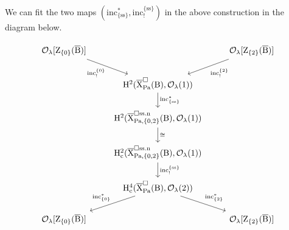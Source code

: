 \documentclass[10pt]{amsart}
\numberwithin{equation}{section}
\theoremstyle{definition}
\def\Pa{\mathrm{Pa}}
\def\calO{\mathcal{O}}
\def\rmc{\mathrm{c}}
\def\rmB{\mathrm{B}}
\def\rmH{\mathrm{H}}
\def\rmX{\mathrm{X}}
\def\rmZ{\mathrm{Z}}
\begin{document}
We can fit the two maps $(\mathrm{inc}^{\ast}_{\{\mathrm{ss}\}}, \mathrm{inc}^{\{\mathrm{ss}\}}_{!})$ in the above construction in the diagram below.

\begin{equation}\label{ss-diagram}
\begin{tikzcd}
 \calO_{\lambda}[\rmZ_{\{0\}}(\overline{\rmB})] \arrow[rd, "\mathrm{inc}^{\{0\}}_{!}"'] &                                    &  \calO_{\lambda}[\rmZ_{\{2\}}(\overline{\rmB})]\arrow[ld, "\mathrm{inc}^{\{2\}}_{!}"] \\
                   & \rmH^{2}(\overline{\rmX}^{\square}_{\Pa}(\rmB), \calO_{\lambda}(1)) \arrow[d, "\mathrm{inc}^{\ast}_{\{\mathrm{ss}\}}"]                   &                   \\
                   & \rmH^{2}(\overline{\rmX}^{\square\mathrm{ss.n}}_{\Pa,\{0,2\}}(\rmB), \calO_{\lambda}(1)) \arrow[d, "\cong"]                   &                   \\
                    & \rmH^{2}_{\rmc}(\overline{\rmX}^{\square\mathrm{ss.n}}_{\Pa,\{0,2\}}(\rmB), \calO_{\lambda}(1)) \arrow[d, "\mathrm{inc}^{\{\mathrm{ss}\}}_{!}"]                   &                   \\
                   &  \rmH^{4}_{\rmc}(\overline{\rmX}^{\square}_{\Pa}(\rmB), \calO_{\lambda}(2)) \arrow[ld, "\mathrm{inc}^{\ast}_{\{0\}}"'] \arrow[rd, "\mathrm{inc}^{\ast}_{\{2\}}"] &                   \\
 \calO_{\lambda}[\rmZ_{\{0\}}(\overline{\rmB})]            &                                    &   \calO_{\lambda}[\rmZ_{\{2\}}(\overline{\rmB})]            
\end{tikzcd}
\end{equation}
\end{document}

